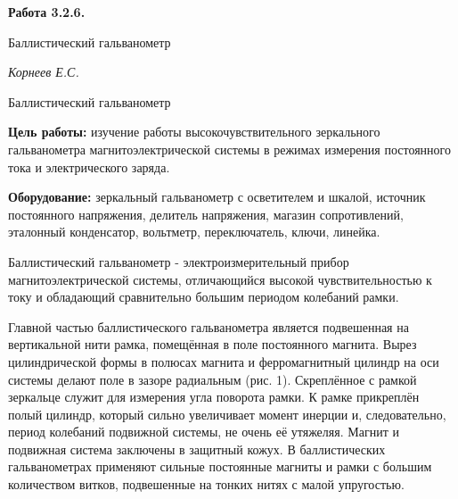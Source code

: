 \documentclass[14pt]{article}
\begin{document}
\begin{titlepage}
	\begin{center}
		\fontsize{18pt}{20pt}\selectfont
		\textbf{Работа 3.2.6.}	
	
		\vspace{5cm}
		\fontsize{24pt}{25pt}\selectfont
		Баллистический гальванометр
	\end{center}
	\begin{flushright}
		\fontsize{18pt}{20pt}\selectfont
		\vspace{14cm}
		\hspace{-3cm}
		\textit{Корнеев Е.С.}
	\end{flushright}		
\end{titlepage}

\begin{center}
	\fontsize{16pt}{18pt}\selectfont	
	Баллистический гальванометр
\end{center}


\fontsize{14pt}{16pt}\selectfont
\vspace{1cm}
\textbf{Цель работы:} изучение работы высокочувствительного зеркального гальванометра магнитоэлектрической системы в режимах измерения постоянного тока и электрического заряда.

\vspace{0.5cm}
\textbf{Оборудование:} зеркальный гальванометр с осветителем и шкалой, источник постоянного напряжения, делитель напряжения, магазин сопротивлений, эталонный конденсатор, вольтметр, переключатель, ключи, линейка. 

\vspace{1cm}
Баллистический гальванометр - электроизмерительный прибор магнитоэлектрической системы, отличающийся высокой чувствительностью к току и обладающий сравнительно большим периодом колебаний рамки. 

Главной частью баллистического гальванометра является подвешенная на вертикальной нити рамка, помещённая в поле постоянного магнита. Вырез цилиндрической формы в полюсах магнита и ферромагнитный цилиндр на оси системы делают поле в зазоре радиальным (рис. 1). Скреплённое с рамкой зеркальце служит для измерения угла поворота рамки. К рамке прикреплён полый цилиндр, который сильно увеличивает момент инерции и, следовательно, период колебаний подвижной системы, не очень её утяжеляя. Магнит и подвижная система заключены в защитный кожух. В баллистических гальванометрах применяют сильные постоянные магниты и рамки с большим количеством витков, подвешенные на тонких нитях с малой упругостью.
\end{document}
